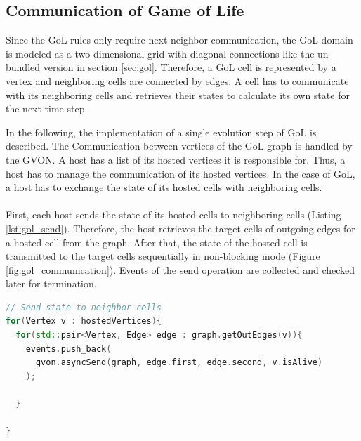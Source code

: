 \subsection{Communication of Game of Life}
\label{sec:gol_imp}
Since the GoL rules only require next neighbor communication, the GoL
domain is modeled as a two-dimensional grid with diagonal connections
like the un-bundled version in section \ref{sec:gol}. Therefore, a GoL cell
is represented by a vertex and neighboring cells are connected by
edges. A cell has to communicate with its neighboring cells and
retrieves their states to calculate its own state for the next time-step.

In the following, the implementation of a single evolution step of GoL
is described. The Communication between vertices of the GoL graph
is handled by the GVON. A host has a list of its hosted vertices it is
responsible for. Thus, a host has to manage the communication of its
hosted vertices. In the case of GoL, a host has to exchange the state
of its hosted cells with neighboring cells.

\paragraph*{}
First, each host sends the state of its hosted cells to neighboring
cells (Listing \ref{lst:gol_send}). Therefore, the host retrieves the
target cells of outgoing edges for a hosted cell from the graph. After
that, the state of the hosted cell is transmitted to the target cells
sequentially in non-blocking mode (Figure
\ref{fig:gol_communication}). Events of the send operation are
collected and checked later for termination.

\begin{lstlisting}[language=C++, label=lst:gol_send, caption={\ }]
// Send state to neighbor cells
for(Vertex v : hostedVertices){
  for(std::pair<Vertex, Edge> edge : graph.getOutEdges(v)){
    events.push_back(
      gvon.asyncSend(graph, edge.first, edge.second, v.isAlive)
    );

  }

}
\end{lstlisting}

